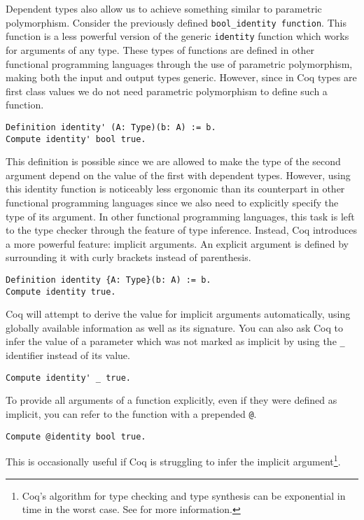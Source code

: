 Dependent types also allow us to achieve something similar to parametric polymorphism. Consider the
previously defined \texttt{bool_identity function}. This function is a less powerful version
of the generic \texttt{identity} function which works for arguments of any type. These types
of functions are defined in other functional programming languages through the use of parametric
polymorphism, making both the input and output types generic. However, since in Coq types are first
class values we do not need parametric polymorphism to define such a function.
\begin{verbatim}
Definition identity' (A: Type)(b: A) := b. 
Compute identity' bool true.
\end{verbatim}
This definition is possible since we are allowed to make the type of the second argument depend on the
value of the first with dependent types. However, using this identity function is noticeably less
ergonomic than its counterpart in other functional programming languages since we also need to 
explicitly specify the type of its argument. In other functional programming languages, this task is
left to the type checker through the feature of type inference. Instead, Coq introduces a more powerful
feature: implicit arguments. An explicit argument is defined by surrounding it with curly brackets instead of parenthesis.
\begin{verbatim}
Definition identity {A: Type}(b: A) := b. 
Compute identity true.
\end{verbatim}
Coq will attempt to derive the value for implicit arguments automatically, using globally available
information as well as its signature. You can also ask Coq to infer the value of a parameter which was
not marked as implicit by using the \texttt{_} identifier instead of its value.
\begin{verbatim}
Compute identity' _ true.
\end{verbatim}
To provide all arguments of a function explicitly, even if they were defined as implicit, you can 
refer to the function with a prepended \texttt{@}.
\begin{verbatim}
Compute @identity bool true.
\end{verbatim}
\noindent This is occasionally useful if Coq is struggling to infer the implicit argument\footnote{Coq's algorithm for type checking and type synthesis can be exponential in time in the worst case. See \cite{CoqTypeCheckingExponential} for more information.}.



